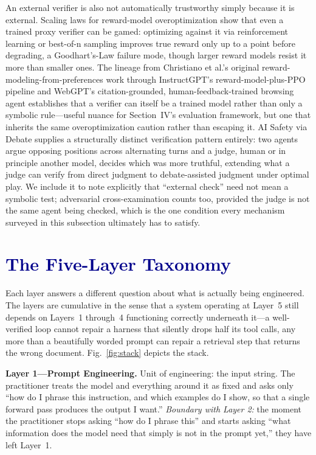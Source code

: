 \documentclass[journal]{IEEEtran}
\begin{document}
An external verifier is also not automatically trustworthy simply because it is external. Scaling laws for reward-model overoptimization \cite{gao2022scaling} show that even a trained proxy verifier can be gamed: optimizing against it via reinforcement learning or best-of-n sampling improves true reward only up to a point before degrading, a Goodhart's-Law failure mode, though larger reward models resist it more than smaller ones. The lineage from Christiano et al.'s original reward-modeling-from-preferences work \cite{christiano2017deep} through InstructGPT's reward-model-plus-PPO pipeline \cite{ouyang2022training} and WebGPT's citation-grounded, human-feedback-trained browsing agent \cite{nakano2021webgpt} establishes that a verifier can itself be a trained model rather than only a symbolic rule---useful nuance for Section~IV's evaluation framework, but one that inherits the same overoptimization caution rather than escaping it. AI Safety via Debate \cite{irving2018ai} supplies a structurally distinct verification pattern entirely: two agents argue opposing positions across alternating turns and a judge, human or in principle another model, decides which was more truthful, extending what a judge can verify from direct judgment to debate-assisted judgment under optimal play. We include it to note explicitly that ``external check'' need not mean a symbolic test; adversarial cross-examination counts too, provided the judge is not the same agent being checked, which is the one condition every mechanism surveyed in this subsection ultimately has to satisfy.

\section{\textcolor{darkblue}{The Five-Layer Taxonomy}}

Each layer answers a different question about what is actually being engineered. The layers are cumulative in the sense that a system operating at Layer~5 still depends on Layers~1 through~4 functioning correctly underneath it---a well-verified loop cannot repair a harness that silently drops half its tool calls, any more than a beautifully worded prompt can repair a retrieval step that returns the wrong document. Fig.~\ref{fig:stack} depicts the stack.

\textbf{Layer 1---Prompt Engineering.} Unit of engineering: the input string. The practitioner treats the model and everything around it as fixed and asks only ``how do I phrase this instruction, and which examples do I show, so that a single forward pass produces the output I want.'' \emph{Boundary with Layer 2:} the moment the practitioner stops asking ``how do I phrase this'' and starts asking ``what information does the model need that simply is not in the prompt yet,'' they have left Layer~1.
\end{document}
